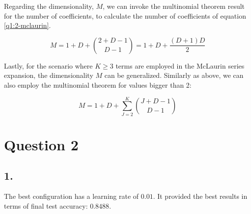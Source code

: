 \documentclass[11pt]{article}
\begin{document}
Regarding the dimensionality, \(M\), we can invoke the multinomial theorem result for the number of coefficients, to calculate the number of coefficients of equation \ref{q1:2-mclaurin}.

\[
M = 1 + D + \binom{2 + D - 1}{D - 1} = 1 + D + \frac{(D+1)D}{2}
\]

Lastly, for the scenario where $K \geq 3$ terms are employed in the McLaurin series expansion, the dimensionality $M$ can be generalized. Similarly as above, we can also employ the multinomial theorem for values bigger than 2:

\[
M = 1 + D + \sum_{J=2}^{K}{\binom{J + D - 1}{D - 1}}
\]

\section*{Question 2}

\subsection*{1.}

The best configuration has a learning rate of $0.01$. It provided the best results in terms of final test accuracy: $0.8488$.
\end{document}
